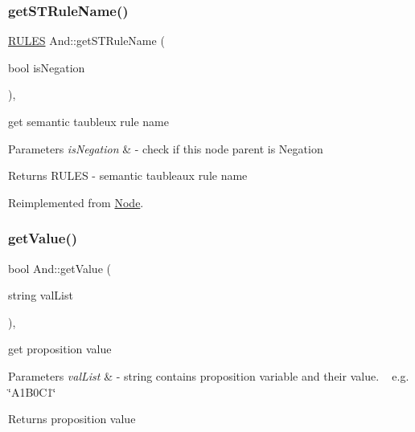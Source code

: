 \mbox{\label{class_and_a9b62ef9a38c6fe9ac96c958d46e30f7b}} 
\subsubsection{\texorpdfstring{get\+S\+T\+Rule\+Name()}{getSTRuleName()}}
{\footnotesize\ttfamily \hyperlink{proposition_2tableaux_2enum_8h_a70c93904c6a27d228050f922eb4fc3b8}{R\+U\+L\+ES} And\+::get\+S\+T\+Rule\+Name (\begin{DoxyParamCaption}\item[{bool}]{is\+Negation }\end{DoxyParamCaption})\hspace{0.3cm}{\ttfamily [override]}, {\ttfamily [virtual]}}



get semantic taubleux rule name 


\begin{DoxyParams}{Parameters}
{\em is\+Negation} & -\/ check if this node parent is Negation \\
\hline
\end{DoxyParams}
\begin{DoxyReturn}{Returns}
R\+U\+L\+ES -\/ semantic taubleaux rule name 
\end{DoxyReturn}


Reimplemented from \hyperlink{class_node_a25b6581950988c2536a392a6874c8072}{Node}.

\mbox{\label{class_and_a9d2b965d8a1b80d0e2da9d6537601e14}} 
\subsubsection{\texorpdfstring{get\+Value()}{getValue()}}
{\footnotesize\ttfamily bool And\+::get\+Value (\begin{DoxyParamCaption}\item[{string}]{val\+List }\end{DoxyParamCaption})\hspace{0.3cm}{\ttfamily [override]}, {\ttfamily [virtual]}}



get proposition value 


\begin{DoxyParams}{Parameters}
{\em val\+List} & -\/ string contains proposition variable and their value. ~\newline
 e.\+g. \char`\"{}\+A1\+B0\+C1\char`\"{} \\
\hline
\end{DoxyParams}
\begin{DoxyReturn}{Returns}
proposition value 
\end{DoxyReturn}



